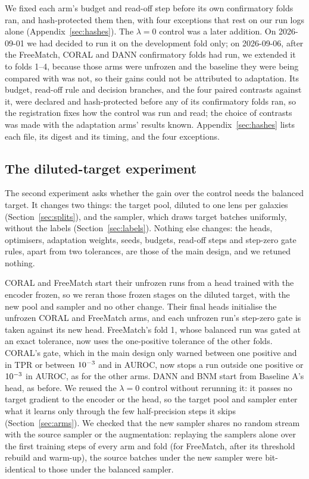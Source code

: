 We fixed each arm's budget and read-off step before its own confirmatory folds ran, and
hash-protected them then, with four exceptions that rest on our run logs alone
(Appendix~\ref{sec:hashes}). The $\lambda=0$ control was a later addition. On 2026-09-01 we had
decided to run it on the development fold only; on 2026-09-06, after the FreeMatch, CORAL and
DANN confirmatory folds had run, we extended it to folds 1--4, because those arms were unfrozen
and the baseline they were being compared with was not, so their gains could not be attributed
to adaptation. Its budget, read-off rule and decision branches, and the four paired contrasts
against it, were declared and hash-protected before any of its confirmatory folds ran, so the
registration fixes how the control was run and read; the choice of contrasts was made with the
adaptation arms' results known. Appendix~\ref{sec:hashes} lists each file, its digest and its
timing, and the four exceptions.

\subsection{The diluted-target experiment}
\label{sec:dilute-methods}

The second experiment asks whether the gain over the control needs the balanced target. It
changes two things: the target pool, diluted to one lens per \dlRatio{} galaxies
(Section~\ref{sec:splits}), and the sampler, which draws target batches uniformly, without the
labels (Section~\ref{sec:labels}). Nothing else changes: the heads, optimisers, adaptation
weights, seeds, budgets, read-off steps and step-zero gate rules, apart from two tolerances,
are those of the main design, and we retuned nothing.

CORAL and FreeMatch start their unfrozen runs from a head trained with the encoder frozen, so we
reran those frozen stages on the diluted target, with the new pool and sampler and no other
change. Their final heads initialise the unfrozen CORAL and FreeMatch arms, and each unfrozen
run's step-zero gate is taken against its new head. FreeMatch's fold 1, whose balanced run was
gated at an exact tolerance, now uses the one-positive tolerance of the other folds. CORAL's
gate, which in the main design only warned between one positive and \coralGateWarnTpr{} in TPR
or between $10^{-3}{}$ and \coralGateAurocAbort{} in AUROC,
now stops a run outside one positive or $10^{-3}{}$ in AUROC, as for the other arms. DANN and BNM
start from Baseline A's head, as before. We reused the $\lambda=0$ control without rerunning it:
it passes no target gradient to the encoder or the head, so the target pool and sampler enter
what it learns only through the few half-precision steps it skips (Section~\ref{sec:arms}). We
checked that the new sampler shares no random stream with the source sampler or the
augmentation: replaying the samplers alone over the first \dlRngSteps{} training steps of every
arm and fold (for FreeMatch, after its threshold rebuild and warm-up), the source batches under
the new sampler were bit-identical to those under the balanced sampler.


